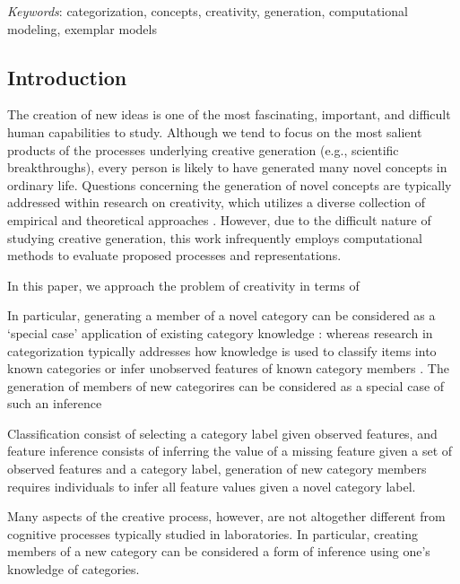\documentclass[12pt]{article}
\begin{document}
\setlength\parindent{0.5in}
{\em Keywords}: categorization, concepts, creativity, generation, computational modeling, exemplar models
\clearpage


\begin{flushleft}

\section{Introduction}
\setlength\parindent{0.5in}


The creation of new ideas is one of the most fascinating, important, and difficult human capabilities to study. Although we tend to focus on the most salient products of the processes underlying creative generation (e.g., scientific breakthroughs), every person is likely to have generated many novel concepts in ordinary life. Questions concerning the generation of novel concepts are typically addressed within research on creativity, which utilizes a diverse collection of empirical and theoretical approaches \citep[see][]{kaufman2010handbook}. However, due to the difficult nature of studying creative generation, this work infrequently employs computational methods to evaluate proposed processes and representations. 

In this paper, we approach the problem of creativity in terms of

In particular, generating a member of a novel category can be considered as a `special case' application of existing category knowledge \cite{kemp2014taxonomy}: whereas research in categorization typically addresses how knowledge is used to classify items into known categories \citep[e.g.,][]{shepard1961learning,nosofsky1994comparing} or infer unobserved features of known category members \citep[see][]{markman2003category}. The generation of members of new categorires can be considered as a special case of such an inference 

Classification consist of selecting a category label given observed features, and feature inference consists of inferring the value of a missing feature given a set of observed features and a category label, generation of new category members requires individuals to infer all feature values given a novel category label.


Many aspects of the creative process, however, are not altogether different from cognitive processes typically studied in laboratories. In particular, creating members of a new category can be considered a form of inference using one's knowledge of categories.




\end{flushleft}
\end{document}
